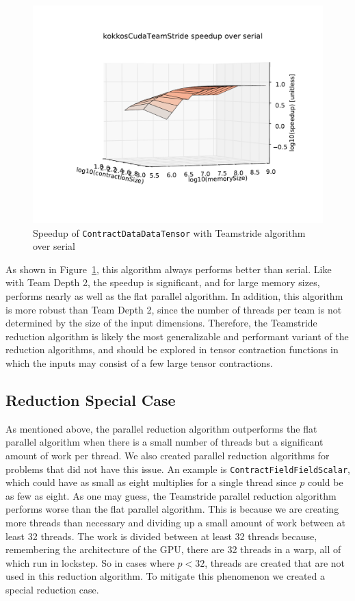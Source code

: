 \begin{figure}[ht]
    \includegraphics[width=5in]{./VersusSerial_kokkosCudaTeamStride_clearCache_shadowfax}
    \caption[Performance of \texttt{ContractDataDataTensor} Teamstride]{Speedup
        of \texttt{ContractDataDataTensor} with Teamstride algorithm over serial
\label{fig:ContractDataDataTensorTeamstride}} 
\end{figure}

As shown in Figure~\ref{fig:ContractDataDataTensorTeamstride}, this algorithm
always performs better than serial.  Like with Team Depth 2, the speedup is
significant, and for large memory sizes, performs nearly as well as the flat
parallel algorithm.  In addition, this algorithm is more robust than Team Depth
2, since the number of threads per team is not determined by the size of the
input dimensions.  Therefore, the Teamstride reduction algorithm is likely the
most generalizable and performant variant of the reduction algorithms, and
should be explored in tensor contraction functions in which the inputs may
consist of a few large tensor contractions.

\subsection{Reduction Special Case}
As mentioned above, the parallel reduction algorithm outperforms the flat
parallel algorithm when there is a small number of threads but a significant
amount of work per
thread. We also created parallel reduction algorithms for problems that did not
have this issue. An example is \texttt{ContractFieldFieldScalar}, which could have as
small as eight multiplies for a single thread since $p$ could be as few as
eight. As one may guess, the Teamstride parallel reduction algorithm performs
worse than the flat parallel algorithm. This is because we are creating more
threads than necessary and dividing up a small amount of work between at least
32 threads. The work is divided between at least 32 threads because, remembering
the architecture of the GPU, there are 32 threads in a warp, all of which run in
lockstep. So in cases where $p < 32$, threads are created that are not used in
this reduction algorithm. To mitigate this phenomenon we created a special
reduction case.

